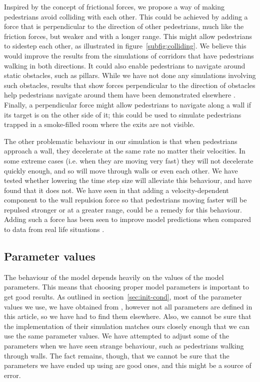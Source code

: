 Inspired by the concept of frictional forces, we propose a way of making
pedestrians avoid colliding with each other. This could be achieved by adding
a force that is perpendicular to the direction of other pedestrians, much like
the friction forces, but weaker and with a longer range.  This might allow
pedestrians to sidestep each other, as illustrated in
figure~\ref{subfig:colliding}. We believe this would improve the results from
the simulations of corridors that have pedestrians walking in both directions.
It could also enable pedestrians to navigate around static obstacles, such as
pillars. While we have not done any simulations involving such obstacles,
results that show forces perpendicular to the direction of obstacles help
pedestrians navigate around them have been demonstrated elsewhere \cite{tang}.
Finally, a perpendicular force might allow pedestrians to navigate along a
wall if its target is on the other side of it; this could be used to simulate
pedestrians trapped in a smoke-filled room where the exits are not visible.

The other problematic behaviour in our simulation is that when pedestrians
approach a wall, they decelerate at the same rate no matter their velocities.
In some extreme cases (i.e. when they are moving very fast) they will not
decelerate quickly enough, and so will move through walls or even each other.
We have tested whether lowering the time step size will alleviate this
behaviour, and have found that it does not. We have seen in \cite{ABconstant}
that adding a  velocity-dependent component to the wall repulsion force so
that pedestrians moving faster will be repulsed stronger or at a greater
range, could be a remedy for this behaviour. Adding such a force has been seen
to improve model predictions when compared to data from real life situations
\cite{ABconstant}.

\subsection{Parameter values}
The behaviour of the model depends heavily on the values of the
model parameters. This means that choosing proper model parameters is
important to get good results. As outlined in section~\ref{sec:init-cond},
most of the parameter values we use, we have obtained from \cite{self-org},
however not all parameters are defined in this article, so we have had to find
them elsewhere. Also, we cannot be sure that the implementation of their
simulation matches ours closely enough that we can use the same parameter
values.  We have attempted to adjust some of the parameters when we have seen
strange behaviour, such as pedestrians walking through walls. The fact
remains, though, that we cannot be sure that the parameters we have ended up
using are good ones, and this might be a source of error.


